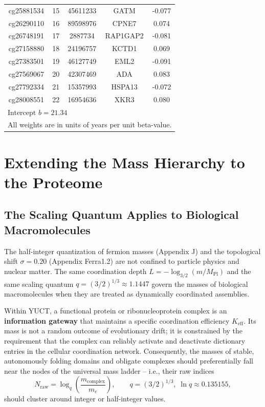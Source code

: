 \documentclass[12pt,a4paper]{article}
\begin{document}
\begin{longtable}{|c|c|c|c|c|}
		cg25881534 & 15 & 45611233 & GATM & -0.077 \\
		cg26290110 & 16 & 89598976 & CPNE7 & 0.074 \\
		cg26748191 & 17 & 2887734 & RAP1GAP2 & -0.081 \\
		cg27158880 & 18 & 24196757 & KCTD1 & 0.069 \\
		cg27383501 & 19 & 46127749 & EML2 & -0.091 \\
		cg27569067 & 20 & 42307469 & ADA & 0.083 \\
		cg27792334 & 21 & 15357993 & HSPA13 & -0.072 \\
		cg28008551 & 22 & 16954636 & XKR3 & 0.080 \\
		\hline
		\multicolumn{5}{l}{\footnotesize Intercept \(b = 21.34\)} \\
		\multicolumn{5}{l}{\footnotesize All weights are in units of years per unit beta-value.} \\
	\end{longtable}
	
	\section{Extending the Mass Hierarchy to the Proteome}
	\label{sec:protein_hierarchy}
	
	\subsection{The Scaling Quantum Applies to Biological Macromolecules}
	
	The half-integer quantization of fermion masses (Appendix J) and the topological shift \(\sigma = 0.20\) (Appendix Ferra1.2) are not confined to particle physics and nuclear matter.  The same coordination depth \(L = -\log_{3/2}(m/M_{\mathrm{Pl}})\) and the same scaling quantum \(q = (3/2)^{1/3} \approx 1.1447\) govern the masses of biological macromolecules when they are treated as dynamically coordinated assemblies.
	
	Within YUCT, a functional protein or ribonucleoprotein complex is an \textbf{information gateway} that maintains a specific coordination efficiency \(K_{\mathrm{eff}}\).  Its mass is not a random outcome of evolutionary drift; it is constrained by the requirement that the complex can reliably activate and deactivate dictionary entries in the cellular coordination network.  Consequently, the masses of stable, autonomously folding domains and obligate complexes should preferentially fall near the nodes of the universal mass ladder -- i.e., their raw indices
	\[
	N_{\mathrm{raw}} = \log_q\!\left(\frac{m_{\mathrm{complex}}}{m_e}\right),
	\qquad q = (3/2)^{1/3},\; \ln q \approx 0.135155,
	\]
	should cluster around integer or half-integer values.
	
\end{document}
